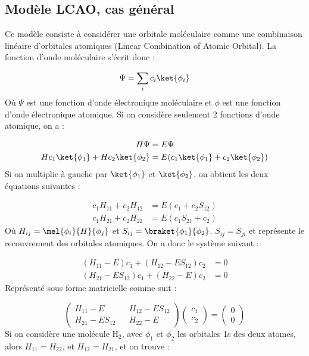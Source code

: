 \subsection{Modèle LCAO, cas général}
Ce modèle consiste à considérer une orbitale moléculaire comme une combinaison linéaire d’orbitales atomiques (Linear Combination of Atomic Orbital). La fonction d'onde moléculaire s'écrit donc :

\[ \Psi = \sum\limits_i c_i\ket{\phi_i} \]
Où $\Psi$ est une fonction d'onde électronique moléculaire et $\phi$ est une fonction d'onde électronique atomique.
Si on considère seulement 2 fonctions d'onde atomique, on a :

\begin{align*}
    H\Psi &= E\Psi\\
    Hc_1\ket{\phi_1} + Hc_2\ket{\phi_2}  &= E(c_1\ket{\phi_1} + c_2\ket{\phi_2})
\end{align*}
Si on multiplie à gauche par $\ket{\phi_1}$ et $\ket{\phi_2}$, on obtient les deux équations suivantes :

\begin{align*}
    c_1H_{11} + c_2H_{12} &= E(c_1+c_2S_{12})\\
    c_1H_{21} + c_2H_{22} &= E(c_1S_{21}+c_2)
\end{align*}
Où $H_{ij} = \mel{\phi_i}{H}{\phi_j}$ et $S_{ij} = \braket{\phi_1}{\phi_2}$. $S_{ij} = S_{ji}$ et représente le recouvrement des orbitales atomiques.
On a donc le système suivant :

\begin{align*}
    (H_{11} - E)c_1 + (H_{12} - ES_{12})c_2 &= 0\\
    (H_{21} - ES_{12})c_1 + (H_{22} - E)c_2 &= 0
\end{align*}
Représenté sous forme matricielle comme suit :

\[
    \begin{pmatrix}
        H_{11}-E && H_{12}-ES_{12}\\
        H_{21}-ES_{12} && H_{22}-E
    \end{pmatrix}
    \begin{pmatrix}
        c_1\\
        c_2
    \end{pmatrix}
    =
    \begin{pmatrix}
        0\\
        0
    \end{pmatrix}
\]
Si on considère une molécule H$_2$, avec $\phi_1$ et $\phi_2$ les orbitales 1s des deux atomes, alors $H_{11} = H_{22}$, et $H_{12} = H_{21}$, et on trouve :

